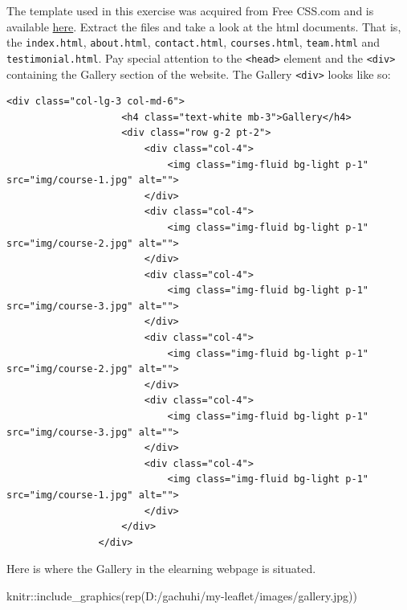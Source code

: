 \documentclass[
]{book}
\newenvironment{Shaded}{\begin{snugshade}}{\end{snugshade}}
\newcommand{\FunctionTok}[1]{\textcolor[rgb]{0.00,0.00,0.00}{#1}}
\newcommand{\NormalTok}[1]{#1}
\newcommand{\SpecialCharTok}[1]{\textcolor[rgb]{0.00,0.00,0.00}{#1}}
\newcommand{\StringTok}[1]{\textcolor[rgb]{0.31,0.60,0.02}{#1}}
\begin{document}
The template used in this exercise was acquired from Free CSS.com and is available \href{https://www.free-css.com/assets/files/free-css-templates/download/page291/elearning.zip}{here}. Extract the files and take a look at the html documents. That is, the \texttt{index.html}, \texttt{about.html}, \texttt{contact.html}, \texttt{courses.html}, \texttt{team.html} and \texttt{testimonial.html}. Pay special attention to the \texttt{\textless{}head\textgreater{}} element and the \texttt{\textless{}div\textgreater{}} containing the Gallery section of the website. The Gallery \texttt{\textless{}div\textgreater{}} looks like so:

\begin{verbatim}
<div class="col-lg-3 col-md-6">
                    <h4 class="text-white mb-3">Gallery</h4>
                    <div class="row g-2 pt-2">
                        <div class="col-4">
                            <img class="img-fluid bg-light p-1" src="img/course-1.jpg" alt="">
                        </div>
                        <div class="col-4">
                            <img class="img-fluid bg-light p-1" src="img/course-2.jpg" alt="">
                        </div>
                        <div class="col-4">
                            <img class="img-fluid bg-light p-1" src="img/course-3.jpg" alt="">
                        </div>
                        <div class="col-4">
                            <img class="img-fluid bg-light p-1" src="img/course-2.jpg" alt="">
                        </div>
                        <div class="col-4">
                            <img class="img-fluid bg-light p-1" src="img/course-3.jpg" alt="">
                        </div>
                        <div class="col-4">
                            <img class="img-fluid bg-light p-1" src="img/course-1.jpg" alt="">
                        </div>
                    </div>
                </div>
\end{verbatim}

Here is where the Gallery in the elearning webpage is situated.

\begin{Shaded}
\begin{Highlighting}[]
\NormalTok{knitr}\SpecialCharTok{::}\FunctionTok{include\_graphics}\NormalTok{(}\FunctionTok{rep}\NormalTok{(}\StringTok{\textquotesingle{}D:/gachuhi/my{-}leaflet/images/gallery.jpg\textquotesingle{}}\NormalTok{))}
\end{Highlighting}
\end{Shaded}
\end{document}

